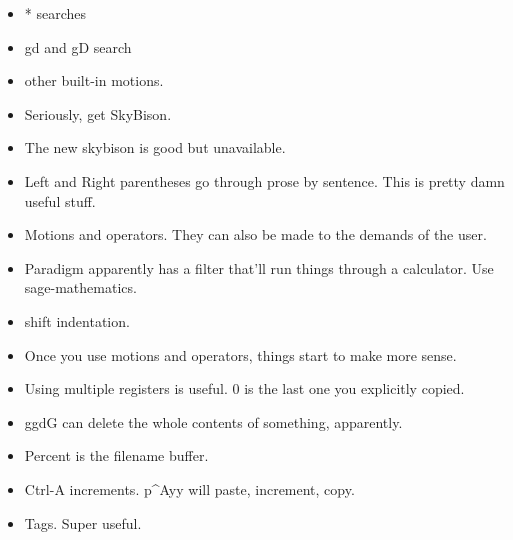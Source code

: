 \documentclass[10pt]{article}
\begin{document}
\begin{itemize}
	\item * searches
	\item gd and gD search
	\item other built-in motions.
	\item Seriously, get SkyBison.
	\item The new skybison is good but unavailable.
	\item Left and Right parentheses go through prose by sentence.  This
		is pretty damn useful stuff.
	\item Motions and operators.  They can also be made to the demands of
		the user.
	\item Paradigm apparently has a filter that'll run things through a 
		calculator.  Use sage-mathematics.
	\item < and > shift indentation.
	\item Once you use motions and operators, things start to make more sense.
	\item Using multiple registers is useful.  0 is the last one you explicitly
		copied.
	\item ggdG can delete the whole contents of something, apparently.
	\item Percent is the filename buffer.
	\item Ctrl-A increments.  p^Ayy will paste, increment, copy.
	\item Tags.  Super useful.
\end{itemize}
\end{document}
